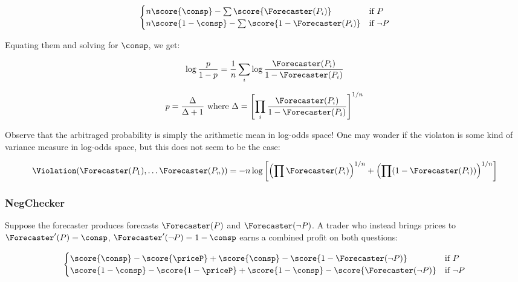 \begin{equation}
\begin{cases}
    n\score{\consp}-\sum{\score{\Forecaster(P_i)}} & \text{if } P \\
    n\score{1-\consp}-\sum{\score{1-\Forecaster(P_i)}} & \text{if } \lnot P
\end{cases}
\label{cfc:eq:profit-paraphrase-multi}
\end{equation}

Equating them and solving for $\consp$, we get:

\begin{equation}
    \log\frac{p}{1-p}=\frac1n\sum_i\log\frac{\Forecaster(P_i)}{1-\Forecaster(P_i)}
    \label{cfc:eq:logodds-paraphrase-multi}
\end{equation}

\begin{equation}
    p=\frac{\Delta}{\Delta+1}
    \text{ where }
    \Delta=\left[\prod_i\frac{\Forecaster(P_i)}{1-\Forecaster(P_i)}\right]^{1/n}
    \label{cfc:eq:prob-paraphrase-multi}
\end{equation}

Observe that the arbitraged probability is simply the arithmetic mean in log-odds space! One may wonder if the violaton is some kind of variance measure in log-odds space, but this does not seem to be the case:

\begin{equation}
    \Violation(\Forecaster(P_1),\dots\Forecaster(P_n))=-n\log\left[
    \left(\prod\Forecaster(P_i)\right)^{1/n} +
    \left(\prod(1-\Forecaster(P_i))\right)^{1/n}
    \right]
    \label{cfc:eq:violation-paraphrase-multi}
\end{equation}

\subsubsection{NegChecker}
\label{cfc:sec:arbitrage-neg}


Suppose the forecaster produces forecasts $\Forecaster(P)$ and $\Forecaster(\lnot P)$. A trader who instead brings prices to $\Forecaster'(P)=\consp$, $\Forecaster'(\lnot P)=1-\consp$ earns a combined profit on both questions:

\begin{equation}
\begin{cases}
    \score{\consp}-\score{\priceP}+\score{\consp}-\score{1-\pricenotP} & \text{if } P \\
    \score{1-\consp}-\score{1-\priceP}+\score{1-\consp}-\score{\pricenotP} & \text{if } \lnot P
\end{cases}
\label{cfc:eq:profit-neg}
\end{equation}

